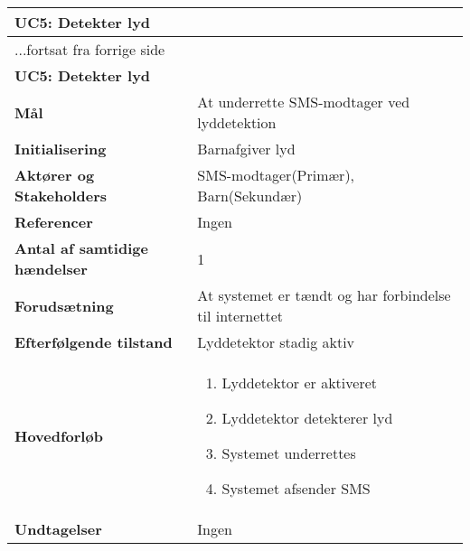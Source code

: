 \begin{center} \centering
	\begin{longtable}{|p{6cm}|p{8cm}|}
	\hline
		\multicolumn{2}{|l|}{\textbf{UC5: Detekter lyd}} \\\hline
		\endfirsthead
		
		\multicolumn{2}{l}{...fortsat fra forrige side} \\ \hline 
		\multicolumn{2}{|l|}{\textbf{UC5: Detekter lyd}} \\\hline
		\endhead	
		
		\textbf{Mål} &
			At underrette SMS-modtager ved lyddetektion \\\hline
		\textbf{Initialisering} &
			Barn\footnotemark afgiver lyd \\\hline
		\textbf{Aktører og Stakeholders} &
			SMS-modtager(Primær), Barn(Sekundær) \\\hline
		\textbf{Referencer}						
			&Ingen \\\hline
		\textbf{Antal af samtidige hændelser} &
			1 \\\hline
		\textbf{Forudsætning} & 
			At systemet er tændt og har forbindelse til internettet \\\hline
		\textbf{Efterfølgende tilstand} &
			Lyddetektor stadig aktiv \\\hline
		\textbf{Hovedforløb} &
			\begin{enumerate}

	
				\item Lyddetektor er aktiveret
												
				\item Lyddetektor detekterer lyd 
				
				\item Systemet underrettes
												
				\item Systemet afsender SMS
								
			\end{enumerate}\\\hline
	
		\textbf{Undtagelser} &
			Ingen \\\hline
			
	\end{longtable}
	\label{UC5} 
\end{center}


